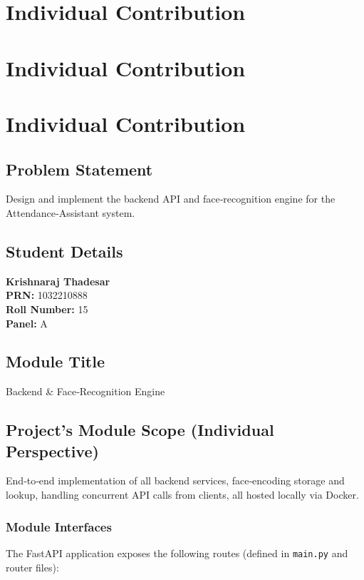 \documentclass[openany]{report}
\begin{document}
\chapter{Individual Contribution}
\chapter{Individual Contribution}
\chapter{Individual Contribution}
\section{Problem Statement}
Design and implement the backend API and face‐recognition engine for the Attendance‐Assistant system.

\section{Student Details}
\textbf{Krishnaraj Thadesar} \\
\textbf{PRN:} 1032210888 \\
\textbf{Roll Number:} 15 \\
\textbf{Panel:} A \\

\section{Module Title}
Backend \& Face‐Recognition Engine

\section{Project’s Module Scope (Individual Perspective)}
End‐to‐end implementation of all backend services, face‐encoding storage and lookup, handling concurrent API calls from clients, all hosted locally via Docker.

\subsection*{Module Interfaces}
The FastAPI application exposes the following routes (defined in \texttt{main.py} and router files):
\end{document}
